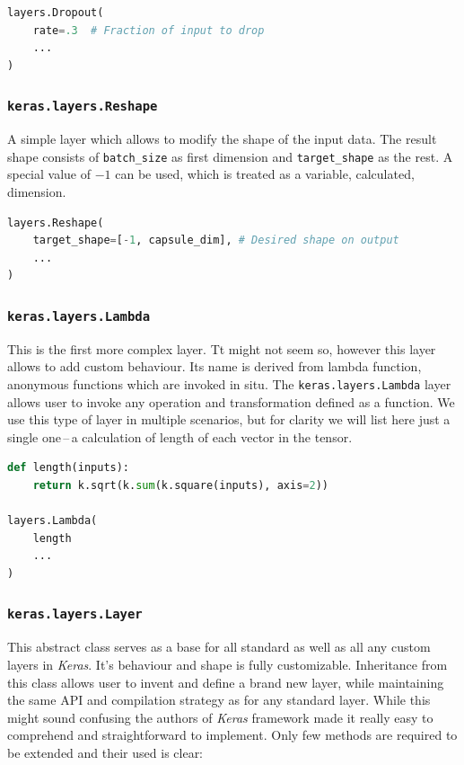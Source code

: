 \begin{lstlisting}[language=Python, caption=Dropout layer]
layers.Dropout(
    rate=.3  # Fraction of input to drop
    ...
)
\end{lstlisting}

\subsubsection{\texttt{keras.layers.Reshape}}

A simple layer which allows to modify the shape of the input data. The result shape consists of \texttt{batch\_size} as first dimension and \texttt{target\_shape} as the rest. A special value of $-1$ can be used, which is treated as a variable, calculated, dimension.

\begin{lstlisting}[language=Python, caption=Reshape layer.]
layers.Reshape(
    target_shape=[-1, capsule_dim], # Desired shape on output
    ...
)
\end{lstlisting}

\subsubsection{\texttt{keras.layers.Lambda}}

This is the first more complex layer. Tt might not seem so, however this layer allows to add custom behaviour. Its name is derived from lambda function, anonymous functions which are invoked in situ. The \texttt{keras.layers.Lambda} layer allows user to invoke any operation and transformation defined as a function. We use this type of layer in multiple scenarios, but for clarity we will list here just a single one\,--\,a calculation of length of each vector in the tensor.

\begin{lstlisting}[language=Python, caption=Lambda layer.]
def length(inputs):
    return k.sqrt(k.sum(k.square(inputs), axis=2))

layers.Lambda(
    length
    ...
)
\end{lstlisting}


\subsubsection{\texttt{keras.layers.Layer}}

This abstract class serves as a base for all standard as well as all any custom layers in \textit{Keras}. It's behaviour and shape is fully customizable. Inheritance from this class allows user to invent and define a brand new layer, while maintaining the same API and compilation strategy as for any standard layer. While this might sound confusing the authors of \textit{Keras} framework made it really easy to comprehend and straightforward to implement. Only few methods are required to be extended and their used is clear:


